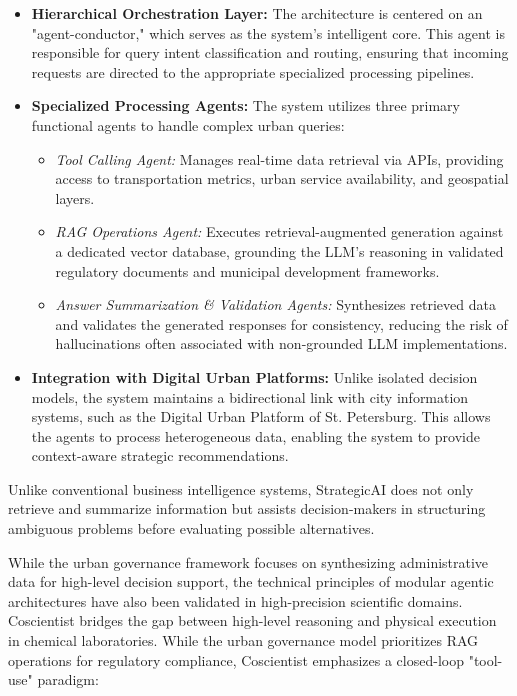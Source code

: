 \begin{itemize}
\item \textbf{Hierarchical Orchestration Layer:} The architecture is centered on an "agent-conductor," which serves as the system's intelligent core. This agent is responsible for query intent classification and routing, ensuring that incoming requests are directed to the appropriate specialized processing pipelines.
\item \textbf{Specialized Processing Agents:} The system utilizes three primary functional agents to handle complex urban queries:
    \begin{itemize}
        \item \textit{Tool Calling Agent:} Manages real-time data retrieval via APIs, providing access to transportation metrics, urban service availability, and geospatial layers.
        \item \textit{RAG Operations Agent:} Executes retrieval-augmented generation against a dedicated vector database, grounding the LLM's reasoning in validated regulatory documents and municipal development frameworks.
        \item \textit{Answer Summarization \& Validation Agents:} Synthesizes retrieved data and validates the generated responses for consistency, reducing the risk of hallucinations often associated with non-grounded LLM implementations.
    \end{itemize}
\item \textbf{Integration with Digital Urban Platforms:} Unlike isolated decision models, the system maintains a bidirectional link with city information systems, such as the Digital Urban Platform of St. Petersburg. This allows the agents to process heterogeneous data, enabling the system to provide context-aware strategic recommendations.
\end{itemize}

Unlike conventional business intelligence systems, StrategicAI does not only retrieve and summarize information but assists decision-makers in structuring ambiguous problems before evaluating possible alternatives.



While the urban governance framework focuses on synthesizing administrative data for high-level decision support, the technical principles of modular agentic architectures have also been validated in high-precision scientific domains. Coscientist \cite{boiko2023autonomous} bridges the gap between high-level reasoning and physical execution in chemical laboratories.
While the urban governance model prioritizes RAG operations for regulatory compliance, Coscientist emphasizes a closed-loop "tool-use" paradigm:

